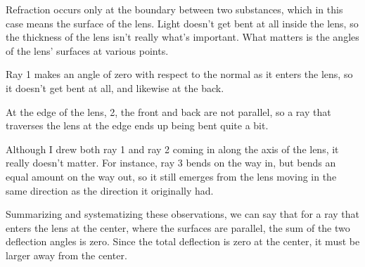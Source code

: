 Refraction occurs only at the boundary between two substances,
which in this case
means the surface of the lens. Light doesn't get bent at all
inside the lens, so the thickness of the lens isn't really
what's important. What matters is the angles of the lens'
surfaces at various points.

Ray 1 makes an angle of zero with respect to the normal as
it enters the lens, so it doesn't get bent at all, and likewise
at the back.

At the edge of the lens, 2, the front and
back are not parallel, so a ray that traverses the lens at
the edge ends up being bent quite a bit.

Although I drew both ray 1 and ray 2 coming in along the axis
of the lens, it really doesn't matter. For instance, ray 3
bends on the way in, but bends an equal amount on the way
out, so it still emerges from the lens moving in the same
direction as the direction it originally had.

Summarizing and systematizing these observations, we can say that
for a ray that enters the lens at the center, where the surfaces
are parallel, the sum of the two deflection angles is zero. Since
the total deflection is zero at the center, it must be larger away
from the center.

